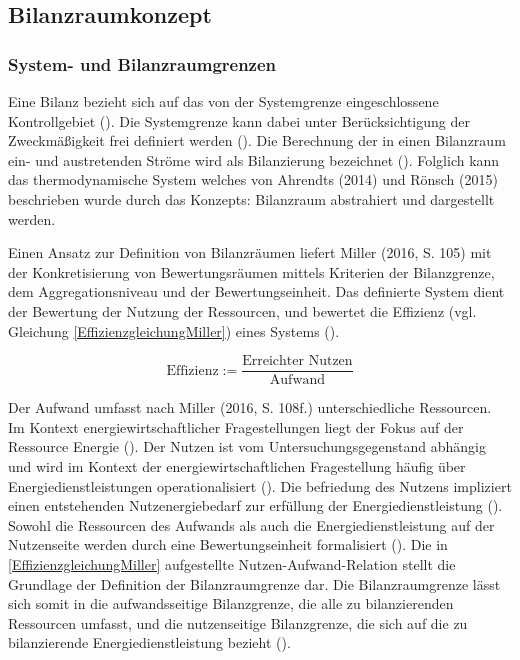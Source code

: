 \subsection{Bilanzraumkonzept}


\subsubsection{System- und Bilanzraumgrenzen}
Eine Bilanz bezieht sich auf das von der Systemgrenze eingeschlossene Kontrollgebiet (\cite[Kapitel 1.5]{Ahrendts.2014}). 
Die Systemgrenze kann dabei unter Berücksichtigung der Zweckmäßigkeit frei definiert werden (\cite[Kapitel 1.5]{Ahrendts.2014}).
Die Berechnung der in einen Bilanzraum ein- und austretenden Ströme wird als Bilanzierung bezeichnet (\cite[S. 65]{Rönsch.2015}).
Folglich kann das thermodynamische System welches von Ahrendts (2014) und Rönsch (2015) beschrieben wurde durch das Konzepts: 
Bilanzraum abstrahiert und dargestellt werden. 

Einen Ansatz zur Definition von Bilanzräumen liefert Miller (2016, S. 105) mit der Konkretisierung von Bewertungsräumen mittels Kriterien der Bilanzgrenze, dem 
Aggregationsniveau und der Bewertungseinheit. 
Das definierte System dient der Bewertung der Nutzung der Ressourcen, und bewertet die Effizienz (vgl. Gleichung \eqref{EffizienzgleichungMiller}) eines Systems 
(\cite[S. 107]{Miller.2016}).

\begin{equation}
    \text{Effizienz} := \frac{\text{Erreichter Nutzen}}{\text{Aufwand}}
    \label{EffizienzgleichungMiller}
\end{equation}

Der Aufwand umfasst nach Miller (2016, S. 108f.) unterschiedliche Ressourcen. 
Im Kontext energiewirtschaftlicher Fragestellungen liegt der Fokus auf der Ressource Energie (\cite[S. 108f.]{Miller.2016}).
Der Nutzen ist vom Untersuchungsgegenstand abhängig und wird im Kontext der energiewirtschaftlichen Fragestellung häufig über Energiedienstleistungen operationalisiert (\cite[S. 107]{Miller.2016}). 
Die befriedung des Nutzens impliziert einen entstehenden Nutzenergiebedarf zur erfüllung der Energiedienstleistung (\cite[S. 107]{Miller.2016}).
Sowohl die Ressourcen des Aufwands als auch die Energiedienstleistung auf der Nutzenseite werden durch eine Bewertungseinheit formalisiert (\cite{Miller.2016}).
Die in \eqref{EffizienzgleichungMiller} aufgestellte Nutzen-Aufwand-Relation stellt die Grundlage der Definition der Bilanzraumgrenze dar.
Die Bilanzraumgrenze lässt sich somit in die aufwandsseitige Bilanzgrenze, die alle zu bilanzierenden Ressourcen umfasst, und die nutzenseitige Bilanzgrenze, 
die sich auf die zu bilanzierende Energiedienstleistung bezieht (\cite[S. 111]{Miller.2016}).

